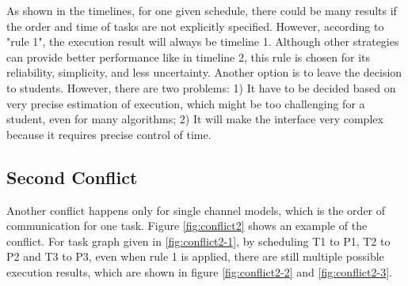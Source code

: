 \documentclass[msc,deptreport, cs]{infthesis}
\begin{document}
As shown in the timelines, for one given schedule, there could be many results if the order and time of tasks are not explicitly specified. However, according to "rule 1", the execution result will always be timeline 1. Although other strategies can provide better performance like in timeline 2, this rule is chosen for its reliability, simplicity, and less uncertainty. Another option is to leave the decision to students. However, there are two problems: 1) It have to be decided based on very precise estimation of execution, which might be too challenging for a student, even for many algorithms; 2) It will make the interface very complex because it requires precise control of time.

\subsection{Second Conflict}

Another conflict happens only for single channel models, which is the order of communication for one task. Figure \ref{fig:conflict2} shows an example of the conflict. For task graph given in \ref{fig:conflict2-1}, by scheduling T1 to P1, T2 to P2 and T3 to P3, even when rule 1 is applied, there are still multiple possible execution results, which are shown in figure \ref{fig:conflict2-2} and \ref{fig:conflict2-3}. 
\end{document}

